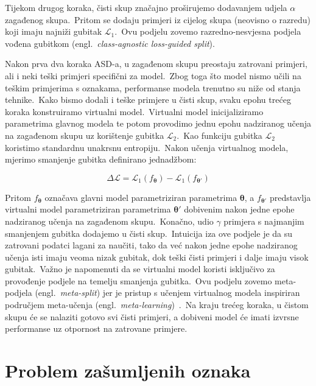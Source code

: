 \documentclass[diplomskirad]{fer}
\begin{document}
Tijekom drugog koraka, čisti skup značajno proširujemo dodavanjem udjela $\alpha$ zagađenog skupa.\ 
Pritom se dodaju primjeri iz cijelog skupa (neovisno o razredu) koji imaju najniži gubitak $\mathcal{L}_1$.\ 
Ovu podjelu zovemo razredno-nesvjesna podjela vođena gubitkom (engl.\ \textit{class-agnostic loss-guided split}).\ 
  
Nakon prva dva koraka ASD-a, u zagađenom skupu preostaju zatrovani primjeri, ali i neki teški primjeri specifični za model.\ 
Zbog toga što model nismo učili na teškim primjerima s oznakama, performanse modela trenutno su niže od stanja tehnike.\ Kako bismo dodali i teške primjere u čisti skup, svaku epohu trećeg koraka konstruiramo virtualni model.\ 
Virtualni model inicijaliziramo parametrima glavnog modela te potom provodimo jednu epohu nadziranog učenja na zagađenom skupu uz korištenje gubitka $\mathcal{L}_2$.\ Kao funkciju gubitka $\mathcal{L}_2$ koristimo standardnu unakrsnu entropiju.\ 
Nakon učenja virtualnog modela, mjerimo smanjenje gubitka definirano jednadžbom:

\begin{equation}
  \Delta \mathcal{L} = \mathcal{L}_1(f_{\bm{\theta}}) - \mathcal{L}_1(f_{\bm{\theta'}})
  \label{eq:asd}
\end{equation}

Pritom $f_{\bm{\theta}}$ označava glavni model parametriziran parametrima $\bm{\theta}$, a $f_{\bm{\theta'}}$ predstavlja virtualni model parametriziran parametrima $\bm{\theta'}$ dobivenim nakon jedne epohe nadziranog učenja na zagađenom skupu.\ 
Konačno, udio $\gamma$ primjera s najmanjim smanjenjem gubitka dodajemo u čisti skup.\ Intuicija iza ove podjele je da su zatrovani podatci lagani za naučiti, tako da već nakon jedne epohe nadziranog učenja isti imaju veoma nizak gubitak, dok teški čisti primjeri i dalje imaju visok gubitak.\ 
Važno je napomenuti da se virtualni model koristi isključivo za provođenje podjele na temelju smanjenja gubitka.\ 
Ovu podjelu zovemo meta-podjela (engl.\ \textit{meta-split}) jer je pristup s učenjem virtualnog modela inspiriran područjem meta-učenja (engl.\ \textit{meta-learning})~\cite{vilalta2002perspective}.\
Na kraju trećeg koraka, u čistom skupu će se nalaziti gotovo svi čisti primjeri, a dobiveni model će imati izvrsne performanse uz otpornost na zatrovane primjere.\

\chapter{Problem zašumljenih oznaka}
\label{pog:zasumljeni}
\end{document}
